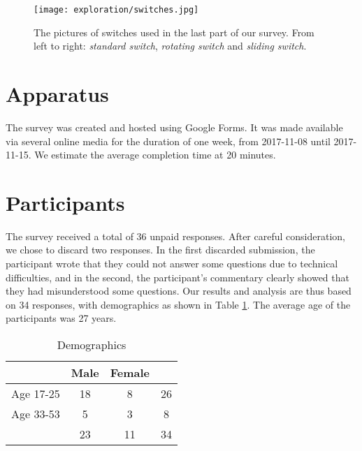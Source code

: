 \begin{figure}
    \centering
    \texttt{[image: exploration/switches.jpg]}
    \caption{The pictures of switches used in the last part of our survey. From left to right: \textit{standard switch}, \textit{rotating switch} and \textit{sliding switch}.}
    \label{fig:explor:switches}
\end{figure}

\section{Apparatus} \label{sec:explor:apparatus}
The survey was created and hosted using Google Forms. It was made available via several online media for the duration of one week, from 2017-11-08 until 2017-11-15. We estimate the average completion time at 20 minutes.

\section{Participants} \label{subsec:explor:participants}
The survey received a total of 36 unpaid responses. After careful consideration, we chose to discard two responses. In the first discarded submission, the participant wrote that they could not answer some questions due to technical difficulties, and in the second, the participant's commentary clearly showed that they had misunderstood some questions. Our results and analysis are thus based on 34 responses, with demographics as shown in Table \ref{table:explor:demographics}. The average age of the participants was 27 years.

    \begin{table}
    \centering
        \begin{tabular}{|c|c c|c|} 
        \hline
                  & Male & Female &    \\
        \hline
        Age 17-25 &   18 &      8 & 26 \\
        Age 33-53 &    5 &      3 &  8 \\
        \hline
                  &   23 &     11 & 34 \\
        \hline
        \end{tabular}
    \caption{Demographics}
    \label{table:explor:demographics}
    \end{table}

